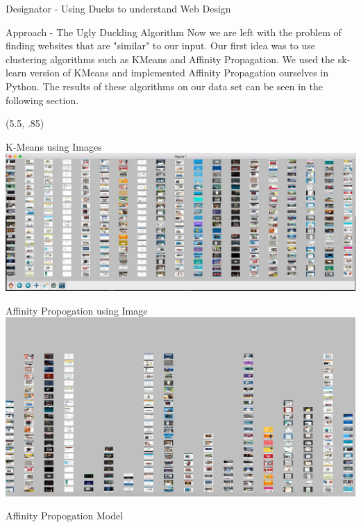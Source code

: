 \documentclass{beamer}
\begin{document}
\begin{frame}{\centerline{\Huge Designator - Using Ducks to understand Web Design}}
\begin{textblock}{5}
\begin{block}{Approach - The Ugly Duckling Algorithm}
Now we are left with the problem of finding websites that are "similar" to our input. Our first idea was to use
clustering algorithms such as KMeans and Affinity Propagation. We used the sk-learn version of KMeans and implemented
Affinity Propagation ourselves in Python. The results of these algorithms on our data set can be seen in the following
section.
\end{block}


\end{textblock}

\begin{textblock}{5}(5.5, .85)

\begin{block}{K-Means using Images}
\includegraphics[scale=.45]{imgkmeans.png}
\end{block}
\begin{block}{Affinity Propogation using Image}
\includegraphics[scale=.45]{affPropImg.jpg}
\end{block}
\begin{block}{Affinity Propogation Model}
\begin{figure}
\centering
{}
\end{figure}


\end{block}
\end{textblock}
\end{frame}
\end{document}
